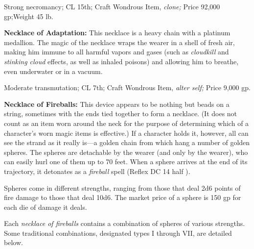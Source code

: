 Strong necromancy; CL 15th; Craft Wondrous Item, \textit{clone; }Price 92,000 gp;Weight 
45 lb.

\textbf{Necklace of Adaptation:} This necklace is a heavy chain with a platinum 
medallion. The magic of the necklace wraps the wearer in a shell of fresh air, 
making him immune to all harmful vapors and gases (such as \textit{cloudkill }and 
\textit{stinking cloud }effects, as well as inhaled poisons) and allowing him to 
breathe, even underwater or in a vacuum.

Moderate transmutation; CL 7th; Craft Wondrous Item, \textit{alter self; }Price 
9,000 gp.

\textbf{Necklace of Fireballs:} This device appears to be nothing but beads on 
a string, sometimes with the ends tied together to form a necklace. (It does not 
count as an item worn around the neck for the purpose of determining which of a 
character's worn magic items is effective.) If a character holds it, however, all 
can see the strand as it really is---a golden chain from which hang a number of 
golden spheres. The spheres are detachable by the wearer (and only by the wearer), 
who can easily hurl one of them up to 70 feet. When a sphere arrives at the end 
of its trajectory, it detonates as a \textit{fireball }spell (Reflex DC 14 half 
)\textit{.}

Spheres come in different strengths, ranging from those that deal 2d6 points of 
fire damage to those that deal 10d6. The market price of a sphere is 150 gp for 
each die of damage it deals.

Each \textit{necklace of fireballs }contains a combination of spheres of various 
strengths. Some traditional combinations, designated types I through VII, are detailed 
below.

